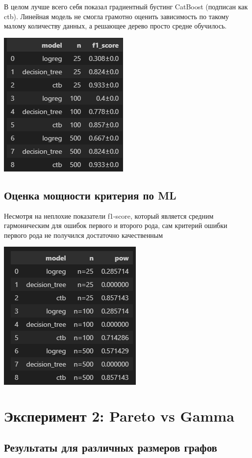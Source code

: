 \documentclass[a4paper,12pt]{report}
\begin{document}
В целом лучше всего себя показал градиентный бустинг CatBoost (подписан как ctb). Линейная модель не смогла грамотно оценить зависимость по такому малому количеству данных, а решающее дерево просто средне обучилось.

\includegraphics[width=0.5\linewidth]{images/ilin_part4.png}

\subsection{Оценка мощности критерия по ML}

Несмотря на неплохие показатели f1-score, который является средним гармоническим для ошибок первого и второго рода, сам критерий ошибки первого рода не получился достаточно качественным 

\includegraphics[width=0.5\linewidth]{images/ilin_part5.png}

\section{Эксперимент 2: Pareto vs Gamma}

\subsection{Результаты для различных размеров графов}
\end{document}
